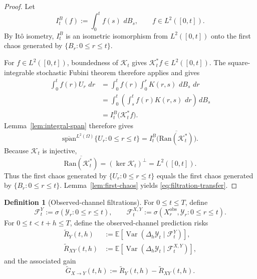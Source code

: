 \documentclass[11pt,a4paper]{amsart}
\theoremstyle{plain}
\theoremstyle{definition}
\newtheorem{definition}[theorem]{Definition}
\theoremstyle{remark}
\DeclareMathOperator{\Var}{Var}
\newcommand{\EE}{\mathbb{E}}
\newcommand{\dd}{\,d}
\begin{document}
\begin{proof}
Let
\[
I_t^B(f):=\int_0^t f(s)\,\dd B_s,
\qquad f\in L^2([0,t]).
\]
By It\^o isometry, \(I_t^B\) is an isometric isomorphism from \(L^2([0,t])\) onto the first chaos
generated by \(\{B_r:0\le r\le t\}\).

For \(f\in L^2([0,t])\), boundedness of \(\mathcal K_t\) gives
\(\mathcal K_t^*f\in L^2([0,t])\).  The square-integrable stochastic Fubini theorem therefore
applies and gives
\begin{align*}
\int_0^t f(r)U_r\,\dd r
&=
\int_0^t f(r)\int_0^r K(r,s)\,\dd B_s\,\dd r \\
&=
\int_0^t \left(\int_s^t f(r)K(r,s)\,\dd r\right)\dd B_s \\
&=
I_t^B\bigl(\mathcal K_t^*f\bigr).
\end{align*}
Lemma~\ref{lem:integral-span} therefore gives
\[
\overline{\mathrm{span}}^{L^2(\Omega)}\{U_r:0\le r\le t\}
=
I_t^B\bigl(\overline{\mathrm{Ran}(\mathcal K_t^*)}\bigr).
\]
Because \(\mathcal K_t\) is injective,
\[
\overline{\mathrm{Ran}(\mathcal K_t^*)}
=
(\ker \mathcal K_t)^\perp
=
L^2([0,t]).
\]
Thus the first chaos generated by \(\{U_r:0\le r\le t\}\) equals the first chaos generated by
\(\{B_r:0\le r\le t\}\).  Lemma~\ref{lem:first-chaos} yields \eqref{eq:filtration-transfer}.
\end{proof}

\begin{definition}[Observed-channel filtrations]\label{def:observed-filtrations}
For $0\le t\le T$, define
\[
\mathcal F_t^Y:=\sigma(\mathcal Y_r:0\le r\le t),
\qquad
\mathcal F_t^{X,Y}:=\sigma(X_r^{\mathrm{obs}},\mathcal Y_r:0\le r\le t).
\]
For $0\le t<t+h\le T$, define the observed-channel prediction risks
\begin{align}
\widetilde R_Y(t,h)
&:=
\EE\!\left[
\Var(\Delta_h\mathcal Y_t\mid \mathcal F_t^Y)
\right], \label{eq:RtildeY}\\
\widetilde R_{XY}(t,h)
&:=
\EE\!\left[
\Var(\Delta_h\mathcal Y_t\mid \mathcal F_t^{X,Y})
\right], \label{eq:RtildeXY}
\end{align}
and the associated gain
\begin{equation}\label{eq:Gtilde}
\widetilde G_{X\to Y}(t,h):=
\widetilde R_Y(t,h)-\widetilde R_{XY}(t,h).
\end{equation}
\end{definition}
\end{document}
